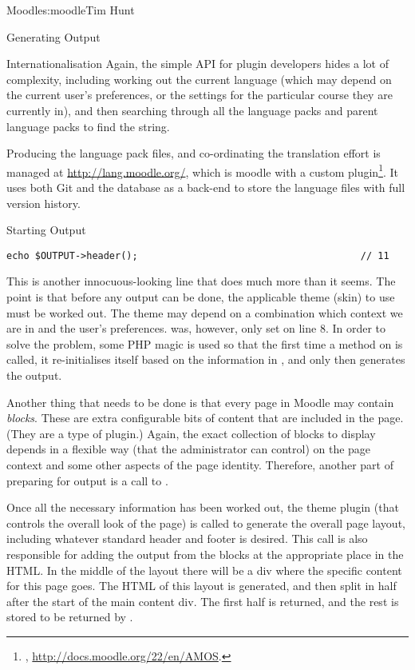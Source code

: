 \begin{aosachapter}{Moodle}{s:moodle}{Tim Hunt}
\begin{aosasect1}{Generating Output}
\begin{aosasect2}{Internationalisation}
Again, the simple  API for plugin developers hides a
lot of complexity, including working out the current language (which
may depend on the current user's preferences, or the settings for the
particular course they are currently in), and then searching through
all the language packs and parent language packs to find the string.

Producing the language pack files, and co-ordinating the translation
effort is managed at \url{http://lang.moodle.org/}, which is moodle
with a custom plugin\footnote{,
  \url{http://docs.moodle.org/22/en/AMOS}.}. It uses both Git and the
database as a back-end to store the language files with full version
history.

\end{aosasect2}

\begin{aosasect2}{Starting Output}

\begin{verbatim}
echo $OUTPUT->header();                                       // 11
\end{verbatim}

This is another innocuous-looking line that does much more than it
seems. The point is that before any output can be done, the applicable
theme (skin) to use must be worked out. The theme may depend on a
combination which context we are in and the user's
preferences.  was, however, only
set on line 8. In order to solve the problem, some PHP magic is used
so that the first time a method on  is called, it
re-initialises itself based on the information in , and
only then generates the output.

Another thing that needs to be done is that every page in Moodle may
contain \emph{blocks}. These are extra configurable bits of content
that are included in the page. (They are a type of plugin.) Again, the
exact collection of blocks to display depends in a flexible way (that
the administrator can control) on the page context and some other
aspects of the page identity. Therefore, another part of preparing for
output is a call to
.

Once all the necessary information has been worked out, the theme
plugin (that controls the overall look of the page) is called to
generate the overall page layout, including whatever standard header
and footer is desired. This call is also responsible for adding the
output from the blocks at the appropriate place in the HTML. In the
middle of the layout there will be a div where the specific content
for this page goes. The HTML of this layout is generated, and then
split in half after the start of the main content div. The first half
is returned, and the rest is stored to be returned by
.


\end{aosasect2}
\end{aosasect1}
\end{aosachapter}
